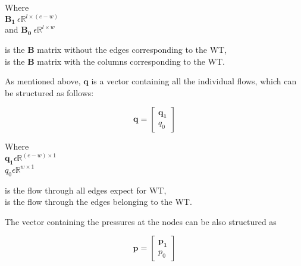 \begin{minipage}[t]{0.18\textwidth}
Where\\
\hspace*{8mm} $\pmb{B_1} \: \epsilon \mathbb{R}^{l \times (e-w)}$  \\
and \hspace*{0.4mm} $\pmb{B_0} \: \epsilon \mathbb{R}^{l \times w} $ 
\end{minipage}
\begin{minipage}[t]{0.70\textwidth}
\vspace*{2mm}
\hspace*{4mm} is the $\pmb{B}$ matrix without the edges corresponding to the WT,\\
\hspace*{4mm} is the $\pmb{B}$ matrix with the columns corresponding to the WT.
\end{minipage}

As mentioned above, $\pmb{q}$ is a vector containing all the individual flows, which can be structured as follows:

\begin{equation}
\pmb{q} =
\begin{bmatrix}
         \pmb{q_1} \\
	q_0 
\end{bmatrix}
\label{qmatrix}
\end{equation}

\begin{minipage}[t]{0.20\textwidth}
Where\\
\hspace*{8mm} $\pmb{q_1} \epsilon \mathbb{R}^{(e-w) \times 1}$  \\
\hspace*{8mm} $q_0 \epsilon \mathbb{R}^{w \times 1} $ 
\end{minipage}
\begin{minipage}[t]{0.68\textwidth}
\vspace*{2mm}
\hspace*{4mm} is the flow through all edges expect for WT,\\
\hspace*{4mm} is the flow through the edges belonging to the WT. 
\end{minipage}

The vector containing the pressures at the nodes can be also structured as

\begin{equation}
\pmb{p} =
\begin{bmatrix}
         \pmb{p_1} \\
	p_0 
\end{bmatrix}
\end{equation}

